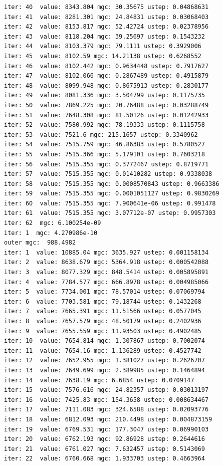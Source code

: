 \documentclass[
  letterpaper,
  DIV=11,
  numbers=noendperiod]{scrartcl}
\begin{document}
\begin{verbatim}
iter: 40  value: 8343.804 mgc: 30.35675 ustep: 0.04868631 
iter: 41  value: 8281.301 mgc: 24.84831 ustep: 0.03068403 
iter: 42  value: 8153.817 mgc: 52.42724 ustep: 0.02378956 
iter: 43  value: 8118.204 mgc: 39.25697 ustep: 0.1543232 
iter: 44  value: 8103.379 mgc: 79.1111 ustep: 0.3929006 
iter: 45  value: 8102.59 mgc: 14.21138 ustep: 0.6268552 
iter: 46  value: 8102.442 mgc: 0.9634448 ustep: 0.7917627 
iter: 47  value: 8102.066 mgc: 0.2867489 ustep: 0.4915879 
iter: 48  value: 8099.948 mgc: 0.8675913 ustep: 0.2830177 
iter: 49  value: 8081.336 mgc: 3.504799 ustep: 0.1175735 
iter: 50  value: 7869.225 mgc: 20.76488 ustep: 0.03288749 
iter: 51  value: 7648.308 mgc: 81.50126 ustep: 0.01242933 
iter: 52  value: 7580.992 mgc: 78.19333 ustep: 0.1115758 
iter: 53  value: 7521.6 mgc: 215.1657 ustep: 0.3340962 
iter: 54  value: 7515.759 mgc: 46.86383 ustep: 0.5780527 
iter: 55  value: 7515.366 mgc: 5.179101 ustep: 0.7603218 
iter: 56  value: 7515.355 mgc: 0.3772467 ustep: 0.8719771 
iter: 57  value: 7515.355 mgc: 0.01410282 ustep: 0.9338038 
iter: 58  value: 7515.355 mgc: 0.0008570843 ustep: 0.9663386 
iter: 59  value: 7515.355 mgc: 0.0001051127 ustep: 0.9830269 
iter: 60  value: 7515.355 mgc: 7.900641e-06 ustep: 0.991478 
iter: 61  value: 7515.355 mgc: 3.07712e-07 ustep: 0.9957303 
iter: 62  mgc: 6.100254e-09 
iter: 1  mgc: 4.270986e-10 
outer mgc:  988.4982 
iter: 1  value: 10885.04 mgc: 3635.927 ustep: 0.001158134 
iter: 2  value: 8638.679 mgc: 5364.918 ustep: 0.000542088 
iter: 3  value: 8077.329 mgc: 848.5414 ustep: 0.005895891 
iter: 4  value: 7784.577 mgc: 666.8978 ustep: 0.004985066 
iter: 5  value: 7734.001 mgc: 78.57014 ustep: 0.07069794 
iter: 6  value: 7703.581 mgc: 79.18744 ustep: 0.1432268 
iter: 7  value: 7665.391 mgc: 11.51566 ustep: 0.0577045 
iter: 8  value: 7657.579 mgc: 48.50179 ustep: 0.2402936 
iter: 9  value: 7655.559 mgc: 11.93503 ustep: 0.4902485 
iter: 10  value: 7654.814 mgc: 1.307867 ustep: 0.7002074 
iter: 11  value: 7654.16 mgc: 1.136289 ustep: 0.4527742 
iter: 12  value: 7652.955 mgc: 1.381027 ustep: 0.2626707 
iter: 13  value: 7649.699 mgc: 2.389985 ustep: 0.1464894 
iter: 14  value: 7638.19 mgc: 6.6854 ustep: 0.0709147 
iter: 15  value: 7576.616 mgc: 24.82357 ustep: 0.03013197 
iter: 16  value: 7425.83 mgc: 154.3658 ustep: 0.008634467 
iter: 17  value: 7111.083 mgc: 324.6588 ustep: 0.02093776 
iter: 18  value: 6812.093 mgc: 210.4498 ustep: 0.004873159 
iter: 19  value: 6769.531 mgc: 177.3047 ustep: 0.06990103 
iter: 20  value: 6762.193 mgc: 92.86928 ustep: 0.2644616 
iter: 21  value: 6761.027 mgc: 7.632457 ustep: 0.5143069 
iter: 22  value: 6760.668 mgc: 1.933703 ustep: 0.4663964 

\end{verbatim}
\end{document}
